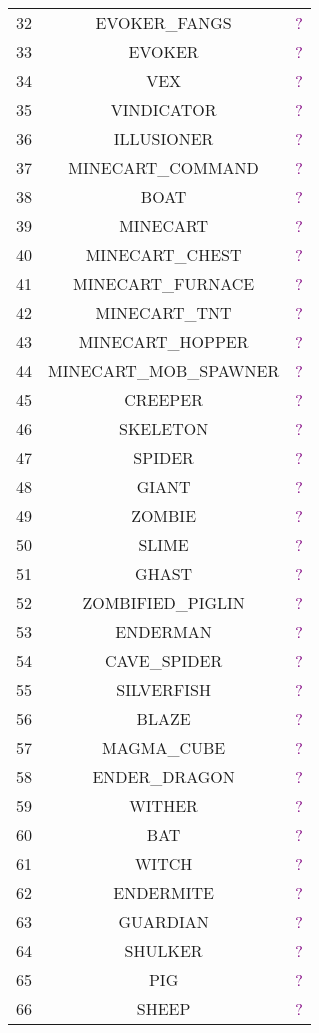 \documentclass[11pt]{article}
\newcommand\myworries[1]{\textcolor{purple}{#1}}
\begin{document}
\begin{longtable}{ |c|c|c| }
	32 & EVOKER\_FANGS & \myworries{?} \\
	33 & EVOKER & \myworries{?} \\
	34 & VEX & \myworries{?} \\
	35 & VINDICATOR & \myworries{?} \\
	36 & ILLUSIONER & \myworries{?} \\
	37 & MINECART\_COMMAND & \myworries{?} \\
	38 & BOAT & \myworries{?} \\
	39 & MINECART & \myworries{?} \\
	40 & MINECART\_CHEST & \myworries{?} \\
	41 & MINECART\_FURNACE & \myworries{?} \\
	42 & MINECART\_TNT & \myworries{?} \\
	43 & MINECART\_HOPPER & \myworries{?} \\
	44 & MINECART\_MOB\_SPAWNER & \myworries{?} \\
	45 & CREEPER & \myworries{?} \\
	46 & SKELETON & \myworries{?} \\
	47 & SPIDER & \myworries{?} \\
	48 & GIANT & \myworries{?} \\
	49 & ZOMBIE & \myworries{?} \\
	50 & SLIME & \myworries{?} \\
	51 & GHAST & \myworries{?} \\
	52 & ZOMBIFIED\_PIGLIN & \myworries{?} \\
	53 & ENDERMAN & \myworries{?} \\
	54 & CAVE\_SPIDER & \myworries{?} \\
	55 & SILVERFISH & \myworries{?} \\
	56 & BLAZE & \myworries{?} \\
	57 & MAGMA\_CUBE & \myworries{?} \\
	58 & ENDER\_DRAGON & \myworries{?} \\
	59 & WITHER & \myworries{?} \\
	60 & BAT & \myworries{?} \\
	61 & WITCH & \myworries{?} \\
	62 & ENDERMITE & \myworries{?} \\
	63 & GUARDIAN & \myworries{?} \\
	64 & SHULKER & \myworries{?} \\
	65 & PIG & \myworries{?} \\
	66 & SHEEP & \myworries{?} \\

\end{longtable}
\end{document}
